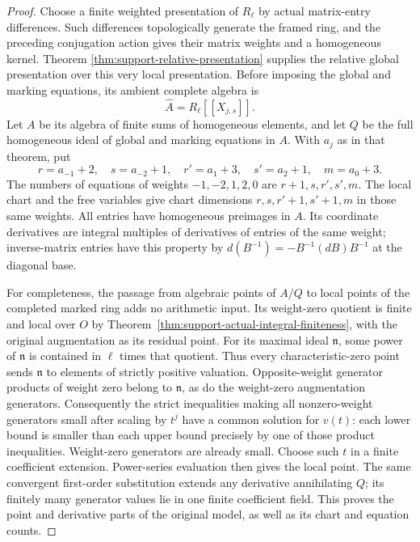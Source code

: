 \begin{proof}
Choose a finite weighted presentation of $R_\ell$ by actual
matrix-entry differences.  Such differences topologically generate
the framed ring, and the preceding conjugation action gives their
matrix weights and a homogeneous kernel.  Theorem
\ref{thm:support-relative-presentation} supplies the relative global
presentation over this very local presentation.  Before imposing the
global and marking equations, its ambient complete algebra is
\[
                       \widehat A=R_\ell[[X_{j,s}]].           \tag{LC9}
\]
Let $A$ be its algebra of finite sums of homogeneous elements, and
let $Q$ be the full homogeneous ideal of global and marking equations
in $A$.  With $a_j$ as in that theorem, put
\[
 r=a_{-1}+2,\quad s=a_{-2}+1,\quad
 r'=a_1+3,\quad s'=a_2+1,\quad m=a_0+3.
\]
The numbers of equations of weights $-1,-2,1,2,0$ are
$r+1,s,r',s',m$.  The local chart and the free variables give
chart dimensions $r,s,r'+1,s'+1,m$ in those same weights.
All entries have homogeneous preimages in $A$.  Its coordinate
derivatives are integral multiples of derivatives of entries of the
same weight; inverse-matrix entries have this property by
$d(B^{-1})=-B^{-1}(dB)B^{-1}$ at the diagonal base.

For completeness, the passage from algebraic points of $A/Q$ to
local points of the completed marked ring adds no arithmetic input.
Its weight-zero quotient is finite and local over $O$ by
Theorem~\ref{thm:support-actual-integral-finiteness}, with the
original augmentation as its residual point.  For its maximal ideal
$\mathfrak n$, some power of $\mathfrak n$ is contained in
$\ell$ times that quotient.  Thus every characteristic-zero point
sends $\mathfrak n$ to elements of strictly positive valuation.
Opposite-weight generator products of weight zero belong to
$\mathfrak n$, as do the weight-zero augmentation generators.
Consequently the strict
inequalities making all nonzero-weight generators small after
scaling by $t^j$ have a common solution for $v(t)$: each lower
bound is smaller than each upper bound precisely by one of those
product inequalities.  Weight-zero generators are already small.
Choose such $t$ in a finite coefficient extension.  Power-series
evaluation then gives the local point.  The same convergent
first-order substitution extends any derivative annihilating $Q$;
its finitely many generator values lie in one finite coefficient
field.  This proves the point and derivative parts of the original
model, as well as its chart and equation counts.


\end{proof}
